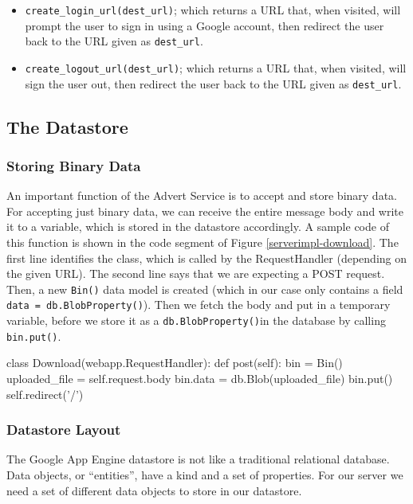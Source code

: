 \begin{itemize} 
\item \texttt{create\_login\_url(dest\_url)}; which returns a URL that, when
visited, will prompt the user to sign in using a Google account, then redirect
the user back to the URL given as \texttt{dest\_url}.
\item \texttt{create\_logout\_url(dest\_url)}; which returns a URL that, when
visited, will sign the user out, then redirect the user back to the URL given as
\texttt{dest\_url}.
\end{itemize}

\subsection{The Datastore}
\subsubsection{Storing Binary Data}
\label{serverimpl-storing-bin}
An important function of the Advert Service is to accept and store binary data.
For accepting just binary data, we can receive the entire message body and write
it to a variable, which is stored in the datastore accordingly. A sample code of
this function is shown in the code segment of Figure \ref{serverimpl-download}.
The first line identifies the class, which is called by the RequestHandler
(depending on the given URL). The second line says that we are expecting a POST
request. Then, a new \texttt{Bin()} data model is created (which in our case only
contains a field \texttt{data = db.BlobProperty()}). Then we fetch the body and
put in a temporary variable, before we store it as a \texttt{db.BlobProperty()}in
the database by calling \texttt{bin.put()}.

\begin{figure*}[ht] %
\begin{center}
\begin{code}
class Download(webapp.RequestHandler):
  def post(self):
    bin = Bin()
    uploaded_file = self.request.body
    bin.data = db.Blob(uploaded_file)
    bin.put()
    self.redirect('/')
\end{code}
\caption{Accepting Binary Data.\label{serverimpl-download}}
\end{center}
\end{figure*}

\subsubsection{Datastore Layout}
The Google App Engine datastore is not like a traditional relational database.
Data objects, or ``entities'', have a kind and a set of properties. For our
server we need a set of different data objects to store in our datastore.

